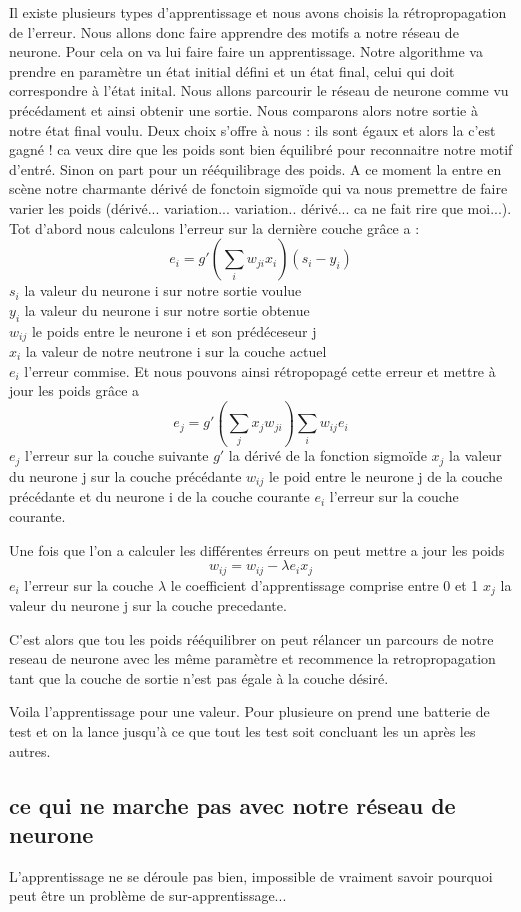 Il existe plusieurs types d'apprentissage et nous avons choisis la rétropropagation de l'erreur.
Nous allons donc faire apprendre des motifs a notre réseau de neurone. Pour cela on va lui faire faire un apprentissage.
 Notre algorithme va prendre en paramètre un état initial défini et un état final, celui qui doit correspondre à  l'état inital.
Nous allons parcourir le réseau de neurone comme vu précédament et ainsi obtenir une sortie. 
Nous comparons alors notre sortie à notre état final voulu.
Deux choix s'offre à nous : ils sont égaux et alors la c'est gagné ! ca veux dire que les poids sont bien équilibré pour reconnaitre notre motif d'entré.
Sinon on part pour un rééquilibrage des poids. A ce moment la entre en scène notre charmante dérivé de fonctoin sigmoïde qui va nous premettre de faire varier les poids (dérivé... variation... variation.. dérivé... ca ne fait rire que moi...).
Tot d'abord nous calculons l'erreur sur la dernière couche grâce a :
\[e_{i} = g'(\sum_{i}w_{ji}x_{i})(s_{i}-y_{i})\]
$s_{i}$ la valeur du neurone i sur notre sortie voulue\\
$y_{i}$ la valeur du neurone i sur notre sortie obtenue\\
$w_{ij}$ le poids entre le neurone i et son prédéceseur j\\
$x_{i}$ la valeur de notre neutrone i sur la couche actuel\\
$e_{i}$ l'erreur commise.
Et nous pouvons ainsi rétropopagé cette erreur et mettre à jour les poids grâce a\[e_{j} = g'(\sum_{j} x_{j} w_{ji})\sum_{i}w_{ij}e_{i}\]
$e_{j}$ l'erreur sur la couche suivante 
$g'$ la dérivé de la fonction sigmoïde
$x_{j}$ la valeur du neurone j sur la couche précédante
$w_{ij}$ le poid entre le neurone j de la couche précédante et du neurone i de la couche courante
$e_{i}$ l'erreur sur la couche courante.

Une fois que l'on a calculer les différentes érreurs on peut mettre a jour les poids 
\[ w_{ij} = w_{ij} - \lambda e_{i} x_{j}\]
$e_{i}$ l'erreur sur la couche 
$\lambda$ le coefficient d'apprentissage comprise entre 0 et 1 
$x_{j}$ la valeur du neurone j sur la couche precedante.

C'est alors que tou les poids rééquilibrer on peut rélancer un parcours de notre reseau de neurone avec les même paramètre et recommence la retropropagation tant que la couche de sortie n'est pas égale à la couche désiré.

Voila l'apprentissage pour une valeur. Pour plusieure on prend une batterie de test et on la lance jusqu'à ce que tout les test soit concluant les un après les autres.

\subsection{ce qui ne marche pas avec notre réseau de neurone}
L'apprentissage ne se déroule pas bien, impossible de vraiment savoir pourquoi peut être un problème de sur-apprentissage...

